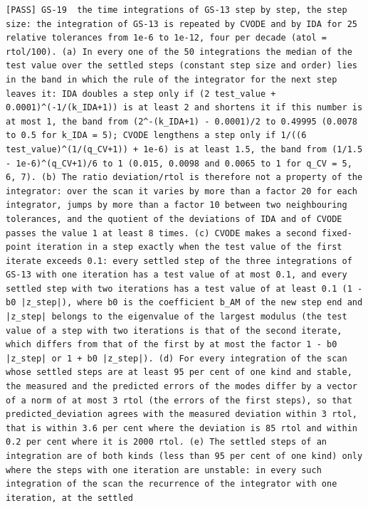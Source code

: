 \documentclass[
  10pt,
]{article}
\begin{document}
\begin{verbatim}
[PASS] GS-19  the time integrations of GS-13 step by step, the step size: the integration of GS-13 is repeated by CVODE and by IDA for 25 relative tolerances from 1e-6 to 1e-12, four per decade (atol = rtol/100). (a) In every one of the 50 integrations the median of the test value over the settled steps (constant step size and order) lies in the band in which the rule of the integrator for the next step leaves it: IDA doubles a step only if (2 test_value + 0.0001)^(-1/(k_IDA+1)) is at least 2 and shortens it if this number is at most 1, the band from (2^-(k_IDA+1) - 0.0001)/2 to 0.49995 (0.0078 to 0.5 for k_IDA = 5); CVODE lengthens a step only if 1/((6 test_value)^(1/(q_CV+1)) + 1e-6) is at least 1.5, the band from (1/1.5 - 1e-6)^(q_CV+1)/6 to 1 (0.015, 0.0098 and 0.0065 to 1 for q_CV = 5, 6, 7). (b) The ratio deviation/rtol is therefore not a property of the integrator: over the scan it varies by more than a factor 20 for each integrator, jumps by more than a factor 10 between two neighbouring tolerances, and the quotient of the deviations of IDA and of CVODE passes the value 1 at least 8 times. (c) CVODE makes a second fixed-point iteration in a step exactly when the test value of the first iterate exceeds 0.1: every settled step of the three integrations of GS-13 with one iteration has a test value of at most 0.1, and every settled step with two iterations has a test value of at least 0.1 (1 - b0 |z_step|), where b0 is the coefficient b_AM of the new step end and |z_step| belongs to the eigenvalue of the largest modulus (the test value of a step with two iterations is that of the second iterate, which differs from that of the first by at most the factor 1 - b0 |z_step| or 1 + b0 |z_step|). (d) For every integration of the scan whose settled steps are at least 95 per cent of one kind and stable, the measured and the predicted errors of the modes differ by a vector of a norm of at most 3 rtol (the errors of the first steps), so that predicted_deviation agrees with the measured deviation within 3 rtol, that is within 3.6 per cent where the deviation is 85 rtol and within 0.2 per cent where it is 2000 rtol. (e) The settled steps of an integration are of both kinds (less than 95 per cent of one kind) only where the steps with one iteration are unstable: in every such integration of the scan the recurrence of the integrator with one iteration, at the settled

\end{verbatim}
\end{document}
